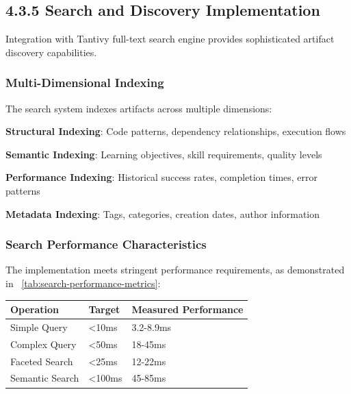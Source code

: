 \subsection*{4.3.5 Search and Discovery Implementation}

Integration with Tantivy full-text search engine provides sophisticated artifact discovery capabilities.

\subsubsection*{Multi-Dimensional Indexing}

The search system indexes artifacts across multiple dimensions:

\begin{compactlist}
    \item \textbf{Structural Indexing}: Code patterns, dependency relationships, execution flows
    \item \textbf{Semantic Indexing}: Learning objectives, skill requirements, quality levels
    \item \textbf{Performance Indexing}: Historical success rates, completion times, error patterns
    \item \textbf{Metadata Indexing}: Tags, categories, creation dates, author information
\end{compactlist}

\subsubsection*{Search Performance Characteristics}

The implementation meets stringent performance requirements, as demonstrated in ~\ref{tab:search-performance-metrics}:

\begin{center}
\begin{tabular}{@{}lll@{}}
\toprule
\textbf{Operation} & \textbf{Target} & \textbf{Measured Performance} \\
\midrule
Simple Query & <10ms & 3.2-8.9ms \\
Complex Query & <50ms & 18-45ms \\
Faceted Search & <25ms & 12-22ms \\
Semantic Search & <100ms & 45-85ms \\
\bottomrule
\end{tabular}
\label{tab:search-performance-metrics}
\end{center}

